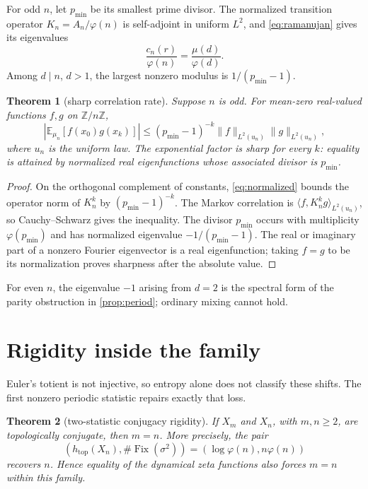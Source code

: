 \documentclass[11pt,a4paper]{amsart}
\newtheorem{theorem}{Theorem}[section]
\theoremstyle{definition}
\theoremstyle{remark}
\newcommand{\Z}{\mathbb Z}
\newcommand{\Fix}{\operatorname{Fix}}
\begin{document}
For odd $n$, let $p_{\min}$ be its smallest prime divisor.  The normalized
transition operator $K_n=A_n/\varphi(n)$ is self-adjoint in uniform
$L^2$, and \eqref{eq:ramanujan} gives its eigenvalues
\begin{equation}\label{eq:normalized}
 \frac{c_n(r)}{\varphi(n)}=\frac{\mu(d)}{\varphi(d)}.
\end{equation}
Among $d\mid n$, $d>1$, the largest nonzero modulus is
$1/(p_{\min}-1)$.

\begin{theorem}[sharp correlation rate]\label{thm:mixing}
Suppose $n$ is odd.  For mean-zero real-valued functions $f,g$ on
$\Z/n\Z$,
\[
 \left|\mathbb E_{\mu_n}[f(x_0)g(x_k)]\right|
 \leq (p_{\min}-1)^{-k}
 \|f\|_{L^2(u_n)}\|g\|_{L^2(u_n)},
\]
where $u_n$ is the uniform law.  The exponential factor is sharp for every
$k$: equality is attained by normalized real eigenfunctions whose
associated divisor is $p_{\min}$.
\end{theorem}

\begin{proof}
On the orthogonal complement of constants, \eqref{eq:normalized} bounds the
operator norm of $K_n^k$ by $(p_{\min}-1)^{-k}$.  The Markov correlation is
$\langle f,K_n^kg\rangle_{L^2(u_n)}$, so Cauchy--Schwarz gives the
inequality.  The
divisor $p_{\min}$ occurs with multiplicity $\varphi(p_{\min})$ and has
normalized eigenvalue $-1/(p_{\min}-1)$.  The real or imaginary part of a
nonzero Fourier eigenvector is a real eigenfunction; taking $f=g$ to be its
normalization proves sharpness after the absolute value.
\end{proof}

For even $n$, the eigenvalue $-1$ arising from $d=2$ is the spectral form of
the parity obstruction in \cref{prop:period}; ordinary mixing cannot hold.

\section{Rigidity inside the family}

Euler's totient is not injective, so entropy alone does not classify these
shifts.  The first nonzero periodic statistic repairs exactly that loss.

\begin{theorem}[two-statistic conjugacy rigidity]\label{thm:rigidity}
If $X_m$ and $X_n$, with $m,n\geq2$, are topologically conjugate, then
$m=n$.  More precisely, the pair
\[
 \left(h_{\mathrm{top}}(X_n),\#\Fix(\sigma^2)\right)
 =\left(\log\varphi(n),n\varphi(n)\right)
\]
recovers $n$.  Hence equality of the dynamical zeta functions also forces
$m=n$ within this family.
\end{theorem}
\end{document}
